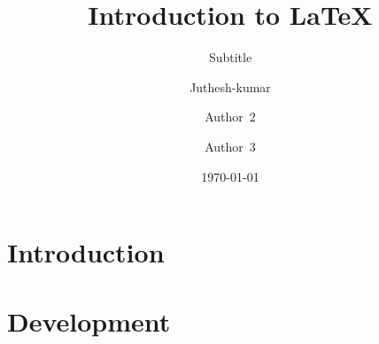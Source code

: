 \documentclass{beamer}
\begin{document}
    \begin{frame}
        \title{Introduction to \LaTeX{}}
        \author{Juthesh-kumar \and 
        Author~2 \and
        Author~3}
        \date{\today}
        \subtitle{Subtitle}
        \maketitle
    \end{frame}
    \section{Introduction}
    \section{Development}
\end{document}
